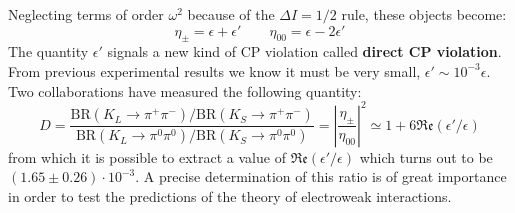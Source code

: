 \documentclass[../main.tex]{subfiles}
\begin{document}
Neglecting terms of order $\omega^2$ because of the $\Delta I=1/2$ rule, these objects become:
\[
\eta_\pm=\epsilon+\epsilon' \qquad \eta_{00}=\epsilon-2\epsilon'
\]
The quantity $\epsilon'$ signals a new kind of CP violation called \textbf{direct CP violation}. From previous experimental results we know it must be very small, $\epsilon'\sim10^{-3}\epsilon$. Two collaborations have measured the following quantity:
\[
D=\frac{\text{BR}(K_L\to\pi^+\pi^-)/\text{BR}(K_S\to\pi^+\pi^-)}{\text{BR}(K_L\to\pi^0\pi^0)/\text{BR}(K_S\to\pi^0\pi^0)}=\left|\frac{\eta_\pm}{\eta_{00}}\right|^2\simeq1+6\mathfrak{Re}(\epsilon'/\epsilon)
\]
from which it is possible to extract a value of $\mathfrak{Re}(\epsilon'/\epsilon)$ which turns out to be $(1.65\pm0.26)\cdot10^{-3}$. A precise determination of this ratio is of great importance in order to test the predictions of the theory of electroweak interactions.
\end{document}
